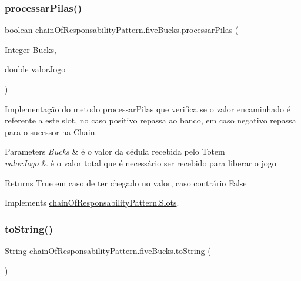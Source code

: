 \subsubsection{\texorpdfstring{processarPilas()}{processarPilas()}}
{\footnotesize\ttfamily boolean chain\+Of\+Responsability\+Pattern.\+five\+Bucks.\+processar\+Pilas (\begin{DoxyParamCaption}\item[{Integer}]{Bucks,  }\item[{double}]{valor\+Jogo }\end{DoxyParamCaption})}



Implementação do metodo processar\+Pilas que verifica se o valor encaminhado é referente a este slot, no caso positivo repassa ao banco, em caso negativo repassa para o sucessor na Chain. 


\begin{DoxyParams}{Parameters}
{\em Bucks} & é o valor da cédula recebida pelo Totem \\
\hline
{\em valor\+Jogo} & é o valor total que é necessário ser recebido para liberar o jogo \\
\hline
\end{DoxyParams}
\begin{DoxyReturn}{Returns}
True em caso de ter chegado no valor, caso contrário False 
\end{DoxyReturn}


Implements \mbox{\hyperlink{interfacechain_of_responsability_pattern_1_1_slots_ade54039583c4faf4126847fe7c143862}{chain\+Of\+Responsability\+Pattern.\+Slots}}.

\mbox{\label{classchain_of_responsability_pattern_1_1five_bucks_ab0901d47763a116f09e0ce493bd61ade}} 
\subsubsection{\texorpdfstring{toString()}{toString()}}
{\footnotesize\ttfamily String chain\+Of\+Responsability\+Pattern.\+five\+Bucks.\+to\+String (\begin{DoxyParamCaption}{ }\end{DoxyParamCaption})}



